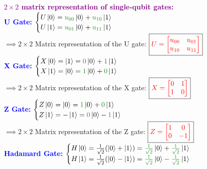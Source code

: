 \documentclass{book}
\begin{document}
\textcolor{purple}{\textbf{$2 \times 2$ matrix representation of single-qubit gates:}}\\
\textcolor{blue}{\textbf{U Gate:}} $\begin{cases}
    U\ket{0} = \textcolor{forestgreen}{u_{00}}\ket{0} + \textcolor{forestgreen}{u_{10}}\ket{1} \\
    U\ket{1} = \textcolor{forestgreen}{u_{01}}\ket{0} + \textcolor{forestgreen}{u_{11}}\ket{1}
\end{cases}$ \\
\hspace{1.5cm} $\implies 2\times 2$ Matrix representation of the U gate: $\boxed{\textcolor{red}{U = \begin{bmatrix} u_{00} & u_{01} \\ u_{10} & u_{11} \end{bmatrix}}}
$ \\
\textcolor{blue}{\textbf{X Gate:}} $\begin{cases}
    X\ket{0} = \ket{1} = \textcolor{forestgreen}{0}\ket{0} + \textcolor{forestgreen}{1}\ket{1} \\
    X\ket{1} = \ket{0} = \textcolor{forestgreen}{1}\ket{0} + \textcolor{forestgreen}{0}\ket{1}
\end{cases}$\\
\hspace{1.5cm} $\implies 2\times 2$ Matrix representation of the X gate: $\boxed{\textcolor{red}{X = \begin{bmatrix} 0 & 1 \\ 1 & 0 \end{bmatrix}}}$\\
\textcolor{blue}{\textbf{Z Gate:}} $\begin{cases}
    Z\ket{0} = \ket{0} = \textcolor{forestgreen}{1}\ket{0} + \textcolor{forestgreen}{0}\ket{1} \\
    Z\ket{1} = -\ket{1} = \textcolor{forestgreen}{0}\ket{0} - \textcolor{forestgreen}{1}\ket{1}
\end{cases}$ \\
\hspace{1.5cm} $\implies 2\times 2$ Matrix representation of the Z gate: $\boxed{\textcolor{red}{Z = \begin{bmatrix} 1 & 0 \\ 0 & -1 \end{bmatrix}}}$\\
\textcolor{blue}{\textbf{Hadamard Gate:}} $\begin{cases}
    H\ket{0} = \frac{1}{\sqrt{2}}(\ket{0} + \ket{1}) = \textcolor{forestgreen}{\frac{1}{\sqrt{2}}}\ket{0} + \textcolor{forestgreen}{\frac{1}{\sqrt{2}}}\ket{1} \\
    H\ket{1} = \frac{1}{\sqrt{2}}(\ket{0} - \ket{1}) = \textcolor{forestgreen}{\frac{1}{\sqrt{2}}}\ket{0} - \textcolor{forestgreen}{\frac{1}{\sqrt{2}}}\ket{1}
\end{cases}$ \\
\end{document}
